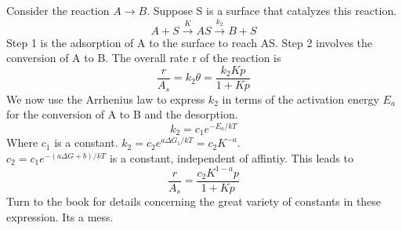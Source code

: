 \documentclass[8pt]{article}
\numberwithin{equation}{section}
\begin{document}
\begin{multicols}{2}
Consider the reaction $A\rightarrow B$. Suppose S is a surface that catalyzes this reaction. \begin{equation}
A+S\xrightarrow{K}AS\xrightarrow{k_{2}}B+S \tag{p. 552}
\end{equation}
Step 1 is the adsorption of A to the surface to reach AS. Step 2 involves the conversion of A to B. The overall rate r of the reaction is 
\begin{equation}
\frac{r}{A_{s}}=k_{2}\theta=\frac{k_{2}Kp}{1+Kp} \tag{27.31}
\end{equation}
We now use the Arrhenius law to express $k_{2}$ in terms of the activation energy $E_{a}$ for the conversion of A to B and the desorption. 
\begin{equation}
k_{2}=c_{1}e^{-E_{a}/kT} \tag{27.32}
\end{equation}
Where $c_{1}$ is a constant. $k_{2}=c_{2}e^{a\Delta G_{1}/kT}=c_{2}K^{-a}$.\\ $c_{2}=c_{1}e^{-(a\Delta G+b)/kT}$ is a constant, independent of affintiy. This leads to 
\begin{equation}
\frac{r}{A_{s}}=\frac{c_{2}K^{1-a}p}{1+Kp} \tag{27.34}
\end{equation}
Turn to the book for details concerning the great variety of constants in these expression. Its a mess.
\setcounter{section}{31}

\end{multicols}
\end{document}
